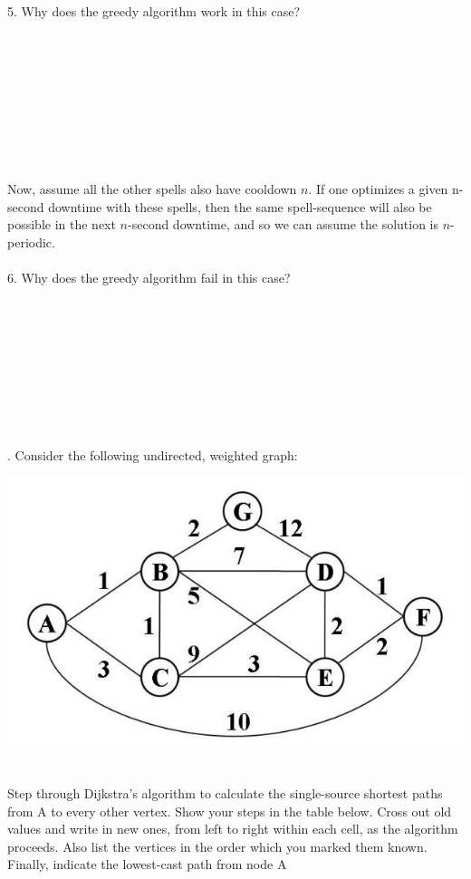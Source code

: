 \documentclass[12pt]{article}
\begin{document}
5. Why does the greedy algorithm work in this case?\\\\\\\\\\\\\\\\\\\\
Now, assume all the other spells also have cooldown $n$. 
If one optimizes a given n-second downtime with these spells, 
then the same spell-sequence will also be possible in the next 
$n$-second downtime, and so we can assume the solution is $n$-periodic.\\\\
6. Why does the greedy algorithm fail in this case?\\\\\\\\\\\\\\\\\\\\ 
\newpage
{}. Consider the following undirected, weighted graph:\\
\centerline{\includegraphics[scale = .7]{graph.jpg}}\\
Step through Dijkstra’s algorithm to calculate the single-source shortest 
paths from A to every other vertex. Show your steps in the table below. 
Cross out old values and write in new ones, from left to right within each 
cell, as the algorithm proceeds. Also list the vertices in the order which 
you marked them known. Finally, indicate the lowest-cast path from node A 
\end{document}
